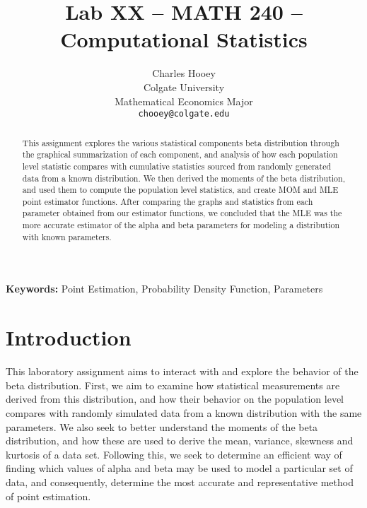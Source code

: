 \documentclass{article}\usepackage[]{graphicx}\usepackage[]{xcolor}
\begin{document}
\vspace{-1in}
\title{Lab XX -- MATH 240 -- Computational Statistics}

\author{
  Charles Hooey \\
  Colgate University  \\
  Mathematical Economics Major  \\
  {\tt chooey@colgate.edu}
}

\date{}

\maketitle

\begin{multicols}{2}
\begin{abstract}
This assignment explores the various statistical components beta distribution through the graphical summarization of each component, and analysis of how each population level statistic compares with cumulative statistics sourced from randomly generated data from a known distribution. We then derived the moments of the beta distribution, and used them to compute the population level statistics, and create MOM and MLE point estimator functions. After comparing the graphs and statistics from each parameter obtained from our estimator functions, we concluded that the MLE was the more accurate estimator of the alpha and beta parameters for modeling a distribution with known parameters. 
\end{abstract}

\noindent \textbf{Keywords:} Point Estimation, Probability Density Function, Parameters

\section{Introduction}
This laboratory assignment aims to interact with and explore the behavior of the beta distribution. First, we aim to examine how statistical measurements are derived from this distribution, and how their behavior on the population level compares with randomly simulated data from a known distribution with the same parameters. We also seek to better understand the moments of the beta distribution, and how these are used to derive the mean, variance, skewness and kurtosis of a data set. Following this, we seek to determine an efficient way of finding which values of alpha and beta may be used to model a particular set of data, and consequently, determine the most accurate and representative method of point estimation.



\end{multicols}
\end{document}
